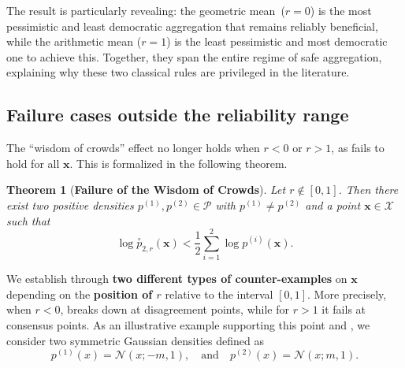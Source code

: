 \documentclass[accepted]{uai2026} %
\newtheorem{theorem}{Theorem}[section]
\newcommand{\vx}{\mathbf{x}}
\newcommand{\compose}[1]{\overset{\circ}{#1}}
\begin{document}
The result is particularly revealing: the geometric mean~\mbox{($r=0$)} is the most pessimistic and least democratic aggregation that remains reliably beneficial, while the arithmetic mean ($r=1$) is the least pessimistic and most democratic one to achieve this. Together, they span the entire regime of safe aggregation, explaining why these two classical rules are privileged in the literature.


\subsection{Failure cases outside the reliability range}\label{section: failure cases cex}
The ``wisdom of crowds'' effect no longer holds when $r<0$ or $r>1$, as  fails to hold for all $\vx$. This is formalized in the following theorem.

\begin{theorem}[\textbf{Failure of the Wisdom of Crowds}]\label{theorem: counterexamples}
Let $r \notin [0,1]$. Then there exist two positive densities
$p^{(1)}, p^{(2)} \in \mathcal{P}$ with $p^{(1)} \neq p^{(2)}$
and a point $\vx \in \mathcal{X}$ such that
\begin{equation}\label{eq: bad inequality likelihood}
\log \compose{p}_{2,r}(\vx)<\frac{1}{2} \sum_{i=1}^2 \log p^{(i)}(\vx).
\end{equation}

\end{theorem}

We establish  through \textbf{two different types of counter-examples} on $\vx$ depending on the \textbf{position of $r$} relative to the interval $[0,1]$. More precisely, when $r < 0$,  breaks down at disagreement points, while for $r>1$ it fails at consensus points. As an illustrative example supporting this point and , we consider two symmetric Gaussian densities defined as \begin{equation}
p^{(1)}(x)=\mathcal{N}(x;-m,1), 
\quad \text{and} \quad 
p^{(2)}(x)=\mathcal{N}(x;m,1).
\end{equation}
\end{document}
